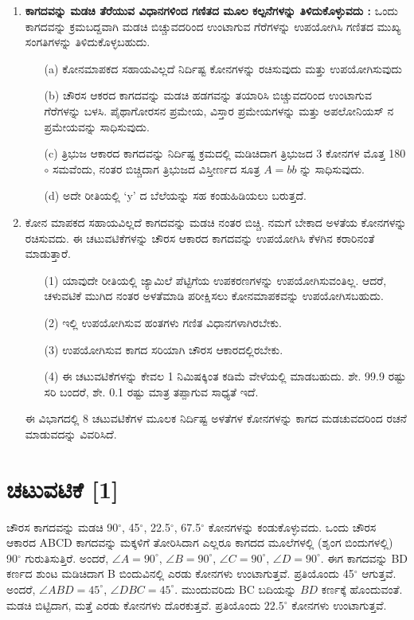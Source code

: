 \begin{enumerate}
\item  \textbf{ಕಾಗದವನ್ನು ಮಡಚಿ ತೆರೆಯುವ ವಿಧಾನಗಳಿಂದ ಗಣಿತದ ಮೂಲ ಕಲ್ಪನೆಗಳನ್ನು ತಿಳಿದುಕೊಳ್ಳುವದು :} ಒಂದು ಕಾಗದವನ್ನು ಕ್ರಮಬದ್ದವಾಗಿ ಮಡಚಿ ಬಿಚ್ಚುವದರಿಂದ ಉಂಟಾಗುವ ಗೆರೆಗಳನ್ನು ಉಪಯೋಗಿಸಿ ಗಣಿತದ ಮುಖ್ಯ ಸಂಗತಿಗಳನ್ನು ತಿಳಿದುಕೊಳ್ಳಬಹುದು.
\begin{itemize}
\item[(a)]  ಕೋನಮಾಪಕದ ಸಹಾಯವಿಲ್ಲದೆ ನಿರ್ದಿಷ್ಟ ಕೋನಗಳನ್ನು ರಚಿಸುವುದು ಮತ್ತು ಉಪಯೋಗಿಸುವುದು 

\item[(b)] ಚೌರಸ ಆಕರದ ಕಾಗದವನ್ನು ಮಡಚಿ ಹಡಗವನ್ನು ತಯಾರಿಸಿ ಬಿಚ್ಚುವದರಿಂದ ಉಂಟಾಗುವ ಗೆರೆಗಳನ್ನು ಬಳಸಿ. ಪೈಥಾಗೋರಸನ ಪ್ರಮೇಯ, ವಿಸ್ತಾರ  ಪ್ರಮೇಯಗಳನ್ನು ಮತ್ತು ಅಪಲೋನಿಯಸ್ ನ ಪ್ರಮೇಯವನ್ನು ಸಾಧಿಸುವುದು. 

\item[(c)] ತ್ರಿಭುಜ ಆಕಾರದ ಕಾಗದವನ್ನು ನಿರ್ದಿಷ್ಟ ಕ್ರಮದಲ್ಲಿ ಮಡಿಚಿದಾಗ ತ್ರಿಭುಜದ 3 ಕೋನಗಳ ಮೊತ್ತ  180$\circ$ ಸಮವೆಂದು, ನಂತರ ಬಿಚ್ಚಿದಾಗ ತ್ರಿಭುಜದ ವಿಸ್ತೀರ್ಣದ ಸೂತ್ರ $A=bb$ ನ್ನು ಸಾಧಿಸುವುದು. 

\item[(d)]  ಅದೇ ರೀತಿಯಲ್ಲಿ  `y' ದ ಬೆಲೆಯನ್ನು ಸಹ ಕಂಡುಹಿಡಿಯಲು ಬರುತ್ತದೆ. 
\end{itemize}

\item  ಕೋನ ಮಾಪಕದ ಸಹಾಯವಿಲ್ಲದೆ ಕಾಗದವನ್ನು ಮಡಚಿ ನಂತರ ಬಿಚ್ಚಿ. ನಮಗೆ ಬೇಕಾದ ಅಳತೆಯ ಕೋನಗಳನ್ನು ರಚಿಸುವದು. ಈ ಚಟುವಟಿಕೆಗಳನ್ನು ಚೌರಸ ಆಕಾರದ ಕಾಗದವನ್ನು ಉಪಯೋಗಿಸಿ ಕೆಳಗಿನ ಕರಾರಿನಂತೆ ಮಾಡುತ್ತಾರೆ. 
\begin{itemize}
\item[(1)] ಯಾವುದೇ ರೀತಿಯಲ್ಲಿ ಜ್ಯಾಮಿಲೆ ಪೆಟ್ಟಿಗೆಯ ಉಪಕರಣಗಳನ್ನು ಉಪಯೋಗಿಸುವಂತಿಲ್ಲ. ಆದರೆ, ಚಳುವಟಿಕೆ ಮುಗಿದ ನಂತರ ಅಳತೆಮಾಡಿ ಪರೀಕ್ಷಿಸಲು ಕೋನಮಾಪಕವನ್ನು ಉಪಯೋಗಿಸಬಹುದು.

\item[(2)] ಇಲ್ಲಿ ಉಪಯೋಗಿಸುವ ಹಂತಗಳು ಗಣಿತ  ವಿಧಾನಗಳಾಗಿರಬೇಕು.

\item[(3)] ಉಪಯೋಗಿಸುವ ಕಾಗದ ಸರಿಯಾಗಿ ಚೌರಸ ಆಕಾರದಲ್ಲಿರಬೇಕು.

\item[(4)] ಈ ಚಟುವಟಿಕೆಗಳನ್ನು ಕೇವಲ 1 ನಿಮಿಷಕ್ಕಿಂತ ಕಡಿಮೆ ವೇಳೆಯಲ್ಲಿ ಮಾಡಬಹುದು. ಶೇ.  99.9 ರಷ್ಟು ಸರಿ ಬಂದರೆ, ಶೇ.  0.1 ರಷ್ಟು ಮಾತ್ರ ತಪ್ಪಾಗುವ ಸಾಧ್ಯತೆ ಇದೆ. 
\end{itemize}

ಈ ವಿಭಾಗದಲ್ಲಿ 8 ಚಟುವಟಿಕೆಗಳ ಮೂಲಕ ನಿರ್ದಿಷ್ಟ ಅಳತೆಗಳ ಕೋನಗಳನ್ನು ಕಾಗದ ಮಡಚುವದರಿಂದ ರಚನೆ ಮಾಡುವದನ್ನು ವಿವರಿಸಿದೆ. 
\end{enumerate}

\section*{ಚಟುವಟಿಕೆ [1]}
ಚೌರಸ ಕಾಗದವನ್ನು ಮಡಚಿ 90$^\circ$,  45$^\circ$, 22.5$^\circ$, 67.5$^\circ$ ಕೋನಗಳನ್ನು ಕಂಡುಕೊಳ್ಳುವದು. ಒಂದು ಚೌರಸ ಆಕಾರದ ABCD ಕಾಗದವನ್ನು ಮಕ್ಕಳಿಗೆ ತೋರಿಸಿದಾಗ ಎಲ್ಲರೂ ಕಾಗದದ ಮೂಲೆಗಳಲ್ಲಿ (ಶೃಂಗ ಬಿಂದುಗಳಲ್ಲಿ) 90$^\circ$ ಗುರುತಿಸುತ್ತಿರೆ. ಅಂದರೆ, $\angle{A} = 90^\circ$, $\angle{B} = 90^\circ$, $\angle{C} = 90^\circ$, $\angle{D} = 90^\circ$. ಈಗ ಕಾಗದವನ್ನು BD ಕರ್ಣದ ಶುಂಟ ಮಡಿಚಿದಾಗ B ಬಿಂದುವಿನಲ್ಲಿ ಎರಡು ಕೋನಗಳು ಉಂಟಾಗುತ್ತವೆ. ಪ್ರತಿಯೊಂದು  45$^\circ$ ಆಗುತ್ತವೆ. ಅಂದರೆ,  $\angle ABD=45^{\circ}$,  $\angle DBC = 45^\circ$. ಮುಂದುವರಿದು  BC ಬದಿಯನ್ನು $BD$ ಕರ್ಣಕ್ಕೆ ಹೊಂದುವಂತೆ. ಮಡಚಿ ಬಿಟ್ಟಿದಾಗ, ಮತ್ತೆ ಎರಡು ಕೋನಗಳು ದೊರಕುತ್ತವೆ. ಪ್ರತಿಯೊಂದು $22.5{^\circ}$ ಕೋನಗಳು ಉಂಟಾಗುತ್ತವೆ. 


